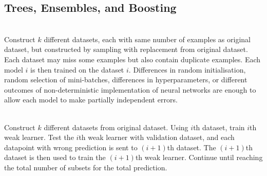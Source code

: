 \subsection{Trees, Ensembles, and Boosting}

\begin{remark} \\
Construct $k$ different datasets, each with same number of examples as original dataset, but constructed by sampling with replacement from original dataset. Each dataset may miss some examples but also contain duplicate examples. Each model $i$ is then trained on the dataset $i$. Differences in random initialisation, random selection of mini-batches, differences in hyperparameters, or different outcomes of non-deterministic implementation of neural networks are enough to allow each model to make partially independent errors.
\end{remark}

\begin{remark} \\
Construct $k$ different datasets from original dataset. Using $i$th dataset, train $i$th weak learner. Test the $i$th weak learner with validation dataset, and each datapoint with wrong prediction is sent to $(i+1)$th dataset. The $(i+1)$th dataset is then used to train the $(i+1)$th weak learner. Continue until reaching the total number of subsets for the total prediction.
\end{remark}
